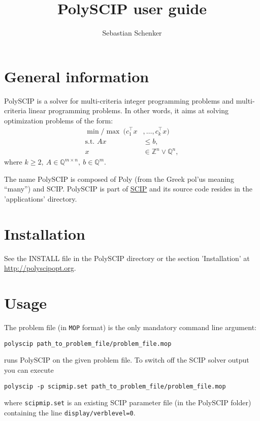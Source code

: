 \documentclass[11pt,listof=totoc]{scrartcl}
\title{PolySCIP user guide}
\author{Sebastian Schenker}
\date{}
\theoremstyle{definition}
\begin{document}
\maketitle
\tableofcontents

\section{General information}
PolySCIP is a solver for multi-criteria integer programming problems
and multi-criteria linear programming problems. In other words, it
aims at solving optimization problems of the form:
\begin{align*}
\min / \max~ (c_1^\top x&, \ldots, c_k^\top x) \\
\mbox{s.t. } Ax &\leq b,\\
x &\in \mathbb{Z}^n \lor \mathbb{Q}^n,
\end{align*}
where $k \geq 2,~ A \in \mathbb{Q}^{m \times n},~ b \in
\mathbb{Q}^m$.

The name PolySCIP is composed of Poly (from the Greek
\textgreek{pol'us} meaning ``many'') and SCIP. PolySCIP is part of \href{http://scipopt.org}{SCIP} and its source code resides in the 'applications' directory.

\section{Installation}

See the INSTALL file in the PolySCIP directory or the section 'Installation' at \url{http://polyscipopt.org}.

\section{Usage}

The problem file (in \texttt{MOP} format) is the only mandatory command line argument:
\begin{verbatim}
polyscip path_to_problem_file/problem_file.mop
\end{verbatim} runs PolySCIP on the given problem file. To switch off the SCIP solver output you can execute 
\begin{verbatim}
polyscip -p scipmip.set path_to_problem_file/problem_file.mop
\end{verbatim} where \texttt{scipmip.set} is an existing SCIP parameter file (in the PolySCIP folder) containing the line \texttt{display/verblevel=0}. 
\end{document}
